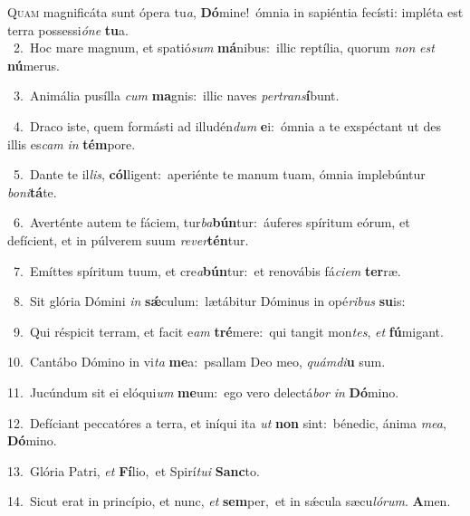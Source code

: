\lettrine{\initial\textcolor{\initialcolor}{Q}}{uam} magnificáta sunt ópera tu\-\textit{a}\-, \textbf{Dó}\-mine!~\star ómnia in sapiéntia fecísti: impléta est terra possessi\-\textit{ó}\-\textit{ne} \textbf{tu}\-a.\\
{\numbfont\textcolor{\numbcolor}{~2.}}~Hoc mare magnum, et spatió\textit{sum} \textbf{má}\-nibus:~\star illic reptília, quorum \textit{non} \textit{est} \textbf{nú}\-merus.\par
{\numbfont\textcolor{\numbcolor}{~3.}}~Animália pusílla \textit{cum} \textbf{ma}\-gnis:~\star illic naves \textit{per}\-\textit{trans}\textbf{í}bunt.\par
{\numbfont\textcolor{\numbcolor}{~4.}}~Draco iste, quem formásti ad illudén\textit{dum} \textbf{e}\-i:~\star ómnia a te exspéctant ut des illis es\textit{cam} \textit{in} \textbf{tém}\-pore.\par
{\numbfont\textcolor{\numbcolor}{~5.}}~Dante te il\-\textit{lis}\-, \textbf{cól}\-ligent:~\star aperiénte te manum tuam, ómnia implebúntur \textit{bo}\-\textit{ni}\textbf{tá}te.\par
{\numbfont\textcolor{\numbcolor}{~6.}}~Averténte autem te fáciem, tur\-\textit{ba}\-\textbf{bún}tur:~\star áuferes spíritum eórum, et defícient, et in púlverem suum \textit{re}\-\textit{ver}\textbf{tén}tur.\par
{\numbfont\textcolor{\numbcolor}{~7.}}~Emíttes spíritum tuum, et cre\-\textit{a}\-\textbf{bún}tur:~\star et renovábis fá\-\textit{ci}\-\textit{em} \textbf{ter}\-ræ.\par
{\numbfont\textcolor{\numbcolor}{~8.}}~Sit glória Dómini \textit{in} \textbf{sǽ}\-culum:~\star lætábitur Dóminus in opé\-\textit{ri}\-\textit{bus} \textbf{su}\-is:\par
{\numbfont\textcolor{\numbcolor}{~9.}}~Qui réspicit terram, et facit e\textit{am} \textbf{tré}\-mere:~\star qui tangit mon\-\textit{tes}\-, \textit{et} \textbf{fú}\-migant.\par
{\numbfont\textcolor{\numbcolor}{10.}}~Cantábo Dómino in vi\textit{ta} \textbf{me}\-a:~\star psallam Deo meo, \textit{quám}\-\textit{di}\textbf{u} sum.\par
{\numbfont\textcolor{\numbcolor}{11.}}~Jucúndum sit ei elóqui\textit{um} \textbf{me}\-um:~\star ego vero delectá\textit{bor} \textit{in} \textbf{Dó}\-mino.\par
{\numbfont\textcolor{\numbcolor}{12.}}~Defíciant peccatóres a terra, et iníqui ita \textit{ut} \textbf{non} sint:~\star bénedic, ánima \textit{me}\-\textit{a}, \textbf{Dó}\-mino.\par
{\numbfont\textcolor{\numbcolor}{13.}}~Glória Patri, \textit{et} \textbf{Fí}\-lio,~\star et Spirí\-\textit{tu}\-\textit{i} \textbf{Sanc}\-to.\par
{\numbfont\textcolor{\numbcolor}{14.}}~Sicut erat in princípio, et nunc, \textit{et} \textbf{sem}\-per,~\star et in sǽcula sæcu\-\textit{ló}\-\textit{rum}. \textbf{A}\-men.\par
